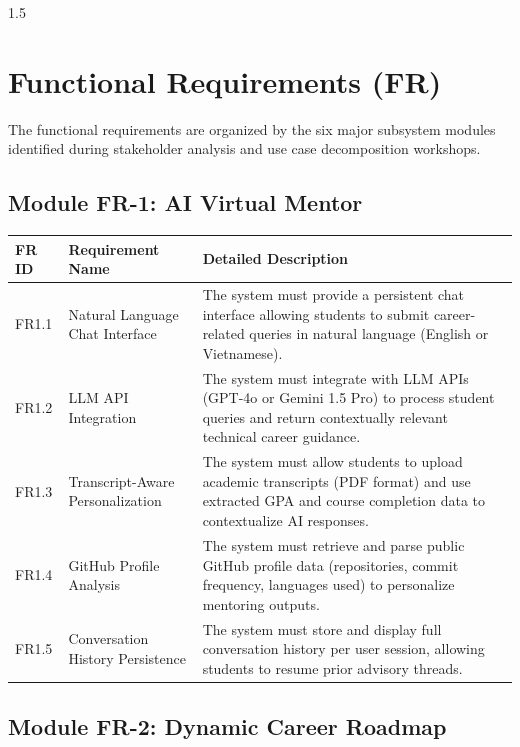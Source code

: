 \documentclass[12pt,a4paper]{report}
\begin{document}
\begin{spacing}{1.5}
		\section{Functional Requirements (FR)}
		
		The functional requirements are organized by the six major subsystem modules identified during stakeholder analysis and use case decomposition workshops.
		
		\subsection{Module FR-1: AI Virtual Mentor}
		
		\begin{longtable}{|p{2cm}|p{4cm}|p{9cm}|}
			\hline
			\rowcolor{mainblue!15}\textbf{FR ID} & \textbf{Requirement Name} & \textbf{Detailed Description} \\ \hline
			FR1.1 & Natural Language Chat Interface & The system must provide a persistent chat interface allowing students to submit career-related queries in natural language (English or Vietnamese). \\ \hline
			FR1.2 & LLM API Integration & The system must integrate with LLM APIs (GPT-4o or Gemini 1.5 Pro) to process student queries and return contextually relevant technical career guidance. \\ \hline
			FR1.3 & Transcript-Aware Personalization & The system must allow students to upload academic transcripts (PDF format) and use extracted GPA and course completion data to contextualize AI responses. \\ \hline
			FR1.4 & GitHub Profile Analysis & The system must retrieve and parse public GitHub profile data (repositories, commit frequency, languages used) to personalize mentoring outputs. \\ \hline
			FR1.5 & Conversation History Persistence & The system must store and display full conversation history per user session, allowing students to resume prior advisory threads. \\ \hline
		\end{longtable}
		
		\subsection{Module FR-2: Dynamic Career Roadmap}
		

\end{spacing}
\end{document}
